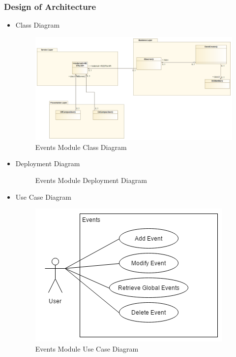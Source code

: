 \documentclass{article}
\begin{document}
			\subsubsection{Design of Architecture}
				\begin{itemize}
					\item Class Diagram
					\begin{center}
						\begin{figure}[!h]
							\includegraphics[scale=0.3]{Events_Class_Diagram.png}
							\caption{Events Module Class Diagram}
						\end{figure}
					\end{center}
					
					\item Deployment Diagram				
					\begin{center}
						\begin{figure}[!h]
							\caption{Events Module Deployment Diagram}
						\end{figure}
					\end{center}
					
					\item Use Case Diagram
					\begin{center}
						\begin{figure}[!h]
							\includegraphics[scale=0.6]{Events_Use_Case_Diagram.png}
							\caption{Events Module Use Case Diagram}
						\end{figure}
					\end{center}
					

\end{itemize}
\end{document}
